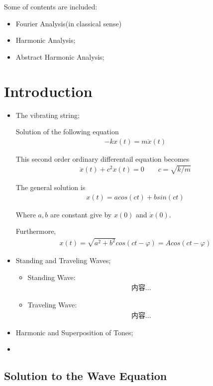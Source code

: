 \documentclass[Total.tex]{subfiles}
\begin{document}
	Some of contents are included:
	\begin{itemize}
		\item Fourier Analysis(in classical sense)
		\item Harmonic Analysis;
		\item Abstract Harmonic Analysis;
	\end{itemize}
	
	\chapter{Introduction}
	\begin{itemize}
		\item The vibrating string;
		
		Solution of the following equation
		\begin{gather*}
			-kx(t)=m\ddot{x}(t)
		\end{gather*}
		
		This second order ordinary differentail equation becomes
		\begin{gather*}
			\ddot{x}(t)+c^2x(t)=0\qquad c=\sqrt{k/m}
		\end{gather*}
		
		The general solution is 
		\begin{gather*}
			x(t)=acos(ct)+bsin(ct)
		\end{gather*}
		
		Where $a,b$ are constant give by $x(0)$ and $\dot{x}(0)$.
		
		Furthermore,
		\begin{gather*}
			x(t)=\sqrt{a^2+b^2}cos(ct-\varphi)=Acos(ct-\varphi)
		\end{gather*}
		\item Standing and Traveling Waves;
		\begin{itemize}
			\item Standing Wave:
			\begin{gather*}
				内容...
			\end{gather*}
			\item Traveling Wave:
			\begin{gather*}
				内容...
			\end{gather*}
		\end{itemize}
		\item Harmonic and Superposition of Tones;
		\item 
	\end{itemize}
	\section{Solution to the Wave Equation}
\end{document}
